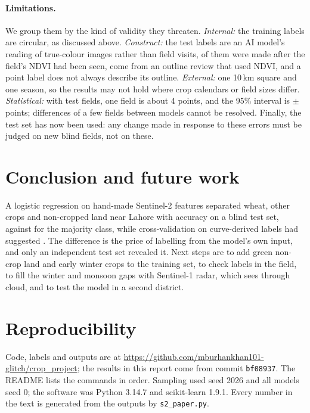 \documentclass[10pt]{article}
\begin{document}
\paragraph{Limitations.} We group them by the kind of validity they threaten.
\emph{Internal:} the training labels are circular, as discussed above.
\emph{Construct:} the test labels are an AI model's reading of true-colour images rather than field
visits, \NNotFullyBlind{} of them were made after the field's NDVI had been seen, \NTestFromReview{}
come from an outline review that used NDVI, and a point label does not always describe its outline.
\emph{External:} one 10\,km square and one season, so the results may not hold where crop calendars or
field sizes differ.
\emph{Statistical:} with \NTest{} test fields, one field is about 4 points, and the 95\% interval is
$\pm$\TestMargin{} points; differences of a few fields between models cannot be resolved.
Finally, the test set has now been used: any change made in response to these errors must be judged on
new blind fields, not on these.

\section{Conclusion and future work}

A logistic regression on \NFeatB{} hand-made Sentinel-2 features separated wheat, other crops and
non-cropped land near Lahore with \TestAcc{} accuracy on a blind test set, against \BaselineTest{} for
the majority class, while cross-validation on curve-derived labels had suggested \CVAcc. The
difference is the price of labelling from the model's own input, and only an independent test set
revealed it. Next steps are to add green non-crop land and early winter crops to the training set, to
check labels in the field, to fill the winter and monsoon gaps with Sentinel-1 radar, which sees
through cloud, and to test the model in a second district.

\section*{Reproducibility}
Code, labels and outputs are at
\url{https://github.com/mburhankhan101-glitch/crop_project}; the results in this report come from
commit \texttt{bf08937}. The README lists the commands in order. Sampling used seed 2026 and all
models seed 0; the software was Python 3.14.7 and scikit-learn 1.9.1. Every number in the text is
generated from the outputs by \texttt{s2\_paper.py}.
\end{document}
